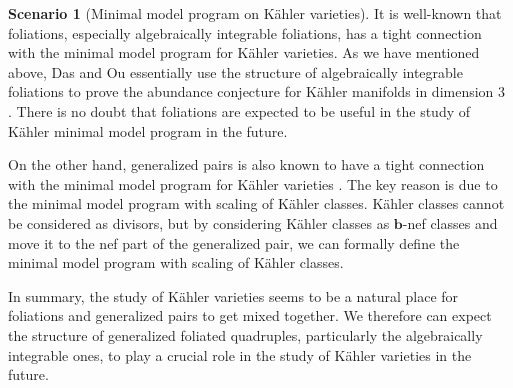 \documentclass[11pt]{amsart}
\numberwithin{equation}{section}
\newcommand{\bb}{\bm{b}}
\theoremstyle{definition}
\theoremstyle{definition}
\newtheorem{sce}[thm]{Scenario}
\theoremstyle{definition}
\begin{document}
\begin{sce}[Minimal model program on K\"ahler varieties]\label{sce: kahler}
It is well-known that foliations, especially algebraically integrable foliations, has a tight connection with the minimal model program for K\"ahler varieties. As we have mentioned above, Das and Ou essentially use the structure of algebraically integrable foliations to prove the abundance conjecture for K\"ahler manifolds in dimension $3$ \cite{DO23a,DO23b}. There is no doubt that foliations are expected to be useful in the study of K\"ahler minimal model program in the future.

On the other hand, generalized pairs is also known to have a tight connection with the minimal model program for K\"ahler varieties \cite{DH23,DHY23}. The key reason is due to the minimal model program with scaling of K\"ahler classes. K\"ahler classes cannot be considered as divisors, but by considering K\"ahler classes as $\bb$-nef classes and move it to the nef part of the generalized pair, we can formally define the minimal model program with scaling of K\"ahler classes.

In summary, the study of K\"ahler varieties seems to be a natural place for foliations and generalized pairs to get mixed together. We therefore can expect the structure of generalized foliated quadruples, particularly the algebraically integrable ones, to play a crucial role in the study of K\"ahler varieties in the future. 
\end{sce}
\end{document}

